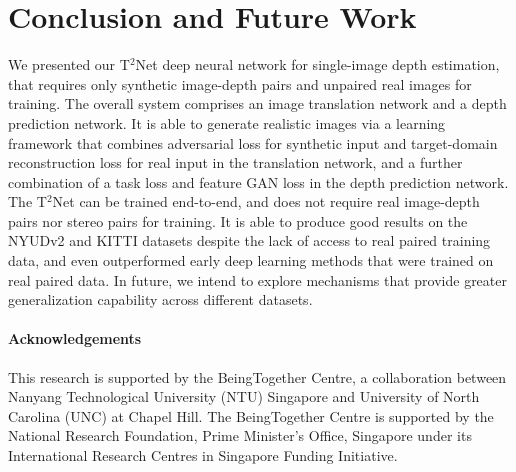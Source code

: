\documentclass[runningheads]{llncs}
\begin{document}
\section{Conclusion and Future Work}

We presented our T$^2$Net deep neural network for single-image depth estimation, that requires only synthetic image-depth pairs and unpaired real images for training. The overall system comprises an image translation network and a depth prediction network. It is able to generate realistic images via a learning framework that combines adversarial loss for synthetic input and target-domain reconstruction loss for real input in the translation network, and a further combination of a task loss and feature GAN loss in the depth prediction network. The T$^2$Net can be trained end-to-end, and does not require real image-depth pairs nor stereo pairs for training. It is able to produce good results on the NYUDv2 and KITTI datasets despite the lack of access to real paired training data, and even outperformed early deep learning methods that were trained on real paired data. In future, we intend to explore mechanisms that provide greater generalization capability across different datasets.

\paragraph{\bf Acknowledgements} This research is supported by the BeingTogether Centre, a collaboration between Nanyang Technological University (NTU) Singapore and University of North Carolina (UNC) at Chapel Hill. The BeingTogether Centre is supported by the National Research Foundation, Prime Minister’s Office, Singapore under its International Research Centres in Singapore Funding Initiative.

\clearpage



\end{document}
